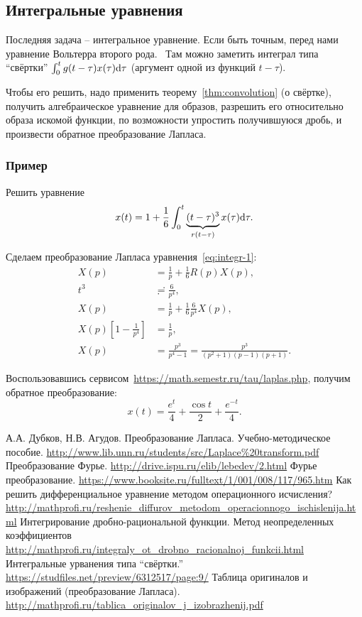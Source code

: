 \documentclass[12pt]{report}
\begin{document}
\subsection{Интегральные уравнения}
Последняя задача -- интегральное уравнение. Если быть точным, перед нами уравнение Вольтерра второго рода.~\cite[см.~ф-лу~8.11]{integral-equations} Там можно заметить интеграл типа ``свёртки'' $\int_0^t g(t-\tau)x(\tau)\mathrm d\tau$ (аргумент одной из функций $t-\tau$).

Чтобы его решить, надо применить теорему~\ref{thm:convolution} (о свёртке), получить алгебраическое уравнение для образов, разрешить его относительно образа искомой функции, по возможности упростить получившуюся дробь, и произвести обратное преобразование Лапласа.

\subsubsection{Пример}
Решить уравнение
\begin{equation}\label{eq:integr-1}
x(t) = 1 + \frac16\int_0^t \underbrace{(t-\tau)^3}_{r(t-\tau)} x(\tau)\mathrm d\tau. 
\end{equation}

Сделаем преобразование Лапласа уравнения~\eqref{eq:integr-1}:
\begin{align*}
X(p) &= \frac1p + \frac16 R(p)X(p), \\
t^3 &\risingdotseq \frac{6}{p^4}, \\
X(p) &= \frac1p + \frac16\frac{6}{p^4}X(p), \\
X(p)\left[1 - \frac{1}{p^4}\right] &= \frac1p, \\
X(p) &= \frac{p^3}{p^4-1} = \frac{p^3}{(p^2+1)(p-1)(p+1)}.
\end{align*}

Воспользовавшись сервисом~\url{https://math.semestr.ru/tau/laplas.php}, получим обратное преобразование:
\[
x(t) = \frac{e^t}{4} + \frac{\cos t}{2} + \frac{e^{-t}}{4}.
\]


\begin{thebibliography}{0}
	А.А. Дубков, Н.В. Агудов. Преобразование Лапласа. Учебно-методическое пособие.
	\url{http://www.lib.unn.ru/students/src/Laplace%20transform.pdf}
	Преобразование Фурье.
	\url{http://drive.ispu.ru/elib/lebedev/2.html}
	Фурье преобразование.
	\url{https://www.booksite.ru/fulltext/1/001/008/117/965.htm}
	Как решить дифференциальное уравнение
	методом операционного исчисления?
	\url{http://mathprofi.ru/reshenie_diffurov_metodom_operacionnogo_ischislenija.html}
	Интегрирование дробно-рациональной функции. 
	Метод неопределенных коэффициентов
	\url{http://mathprofi.ru/integraly_ot_drobno_racionalnoj_funkcii.html}
	Интегральные урванения типа ``свёртки.''
	\url{https://studfiles.net/preview/6312517/page:9/}
	Таблица оригиналов и изображений (преобразование Лапласа).
	\url{http://mathprofi.ru/tablica_originalov_j_izobrazhenij.pdf}
\end{thebibliography}
\end{document}
